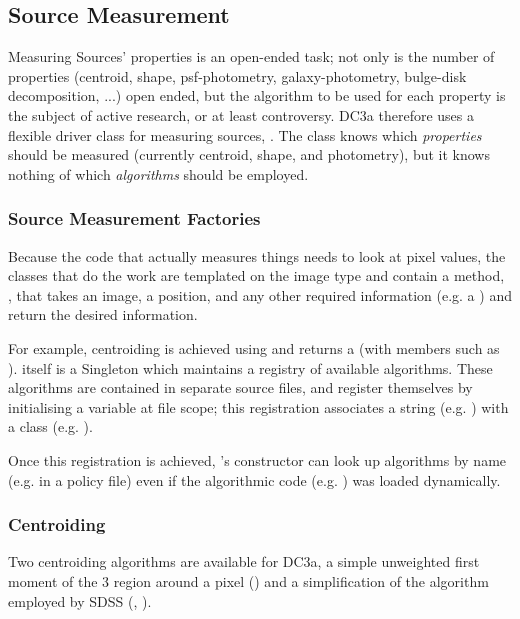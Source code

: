 \subsection{Source Measurement}
\label{secSourceMeasurement}

Measuring Sources' properties is an open-ended task;  not only is the
number of properties (centroid, shape, psf-photometry, galaxy-photometry,
bulge-disk decomposition, ...) open ended, but the algorithm to be
used for each property is the subject of active research, or at least
controversy.  DC3a therefore uses a flexible driver class for measuring
sources, .  The class knows which \textit{properties}
should be measured (currently centroid, shape, and photometry), but
it knows nothing of which \textit{algorithms} should be employed.  

\subsubsection{Source Measurement Factories}
\label{secSourceMeasurementFactories}

Because the code that actually measures things needs to look at pixel
values, the classes that do the work are templated on the image type
and contain a method, , that takes an image, a position,
and any other required information (e.g. a ) and return the
desired information.

For example, centroiding is achieved using  and\break {}
returns a  (with members such as ).   itself is a Singleton which
maintains a registry of available algorithms.  These algorithms are contained in separate source files, and register
themselves by initialising a variable at file scope; this registration associates a string (e.g. ) with a
class (e.g. ).

Once this registration is achieved, 's constructor can look up algorithms by name (e.g. in a policy
file) even if the algorithmic code (e.g. ) was loaded dynamically.

\subsubsection{Centroiding}

Two centroiding algorithms are available for DC3a, a simple unweighted first moment
of the 3 region around a pixel () and a simplification of the algorithm employed by
SDSS (, \citet{SDSSAstrom}).

